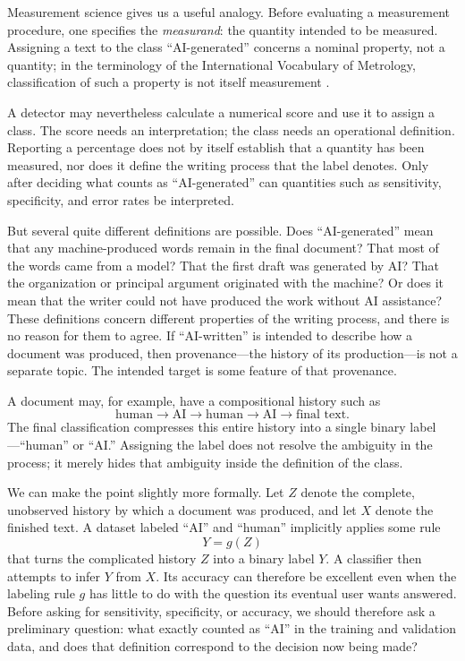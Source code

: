 \documentclass[pdflatex,sn-mathphys-num]{sn-jnl}
\begin{document}
Measurement science gives us a useful analogy. Before evaluating a measurement procedure, one
specifies the \emph{measurand}: the quantity intended to be measured. Assigning a text to the class
``AI-generated'' concerns a nominal property, not a quantity; in the terminology of the International
Vocabulary of Metrology, classification of such a property is not itself measurement \cite{JCGM2012}.

A detector may nevertheless calculate a numerical score and use it to assign a class. The score
needs an interpretation; the class needs an operational definition. Reporting a percentage does not
by itself establish that a quantity has been measured, nor does it define the writing process that
the label denotes. Only after deciding what counts as ``AI-generated'' can quantities such as
sensitivity, specificity, and error rates be interpreted.

But several quite different definitions are possible. Does ``AI-generated'' mean that any
machine-produced words remain in the final document? That most of the words came from a model? That
the first draft was generated by AI\@? That the organization or principal argument originated with
the machine? Or does it mean that the writer could not have produced the work without AI assistance?
These definitions concern different properties of the writing process, and there is no reason for
them to agree. If ``AI-written'' is intended to describe how a document was produced, then
provenance---the history of its production---is not a separate topic. The intended target is some
feature of that provenance.

A document may, for example, have a compositional history such as
\[
\text{human}
\longrightarrow \text{AI}
\longrightarrow \text{human}
\longrightarrow \text{AI}
\longrightarrow \text{final text}.
\]
The final classification compresses this entire history into a single binary label---``human'' or
``AI.'' Assigning the label does not resolve the ambiguity in the process; it merely hides that
ambiguity inside the definition of the class.

We can make the point slightly more formally. Let \(Z\) denote the complete, unobserved history by
which a document was produced, and let \(X\) denote the finished text. A dataset labeled ``AI'' and
``human'' implicitly applies some rule
\[
Y=g(Z)
\]
that turns the complicated history \(Z\) into a binary label \(Y\). A classifier then attempts to
infer \(Y\) from \(X\). Its accuracy can therefore be excellent even when the labeling rule \(g\)
has little to do with the question its eventual user wants answered. Before asking for sensitivity,
specificity, or accuracy, we should therefore ask a preliminary question: what exactly counted as
``AI'' in the training and validation data, and does that definition correspond to the decision now
being made?
\end{document}

